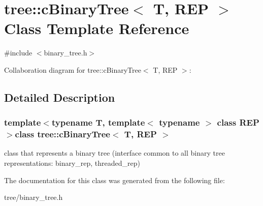 \hypertarget{classtree_1_1cBinaryTree}{\section{tree\-:\-:c\-Binary\-Tree$<$ T, R\-E\-P $>$ Class Template Reference}
\label{classtree_1_1cBinaryTree}
}


{\ttfamily \#include $<$binary\-\_\-tree.\-h$>$}



Collaboration diagram for tree\-:\-:c\-Binary\-Tree$<$ T, R\-E\-P $>$\-:


\subsection{Detailed Description}
\subsubsection*{template$<$typename T, template$<$ typename $>$ class R\-E\-P$>$class tree\-::c\-Binary\-Tree$<$ T, R\-E\-P $>$}

class that represents a binary tree (interface common to all binary tree representations\-: binary\-\_\-rep, threaded\-\_\-rep) 

The documentation for this class was generated from the following file\-:\begin{DoxyCompactItemize}
\item 
tree/binary\-\_\-tree.\-h\end{DoxyCompactItemize}
